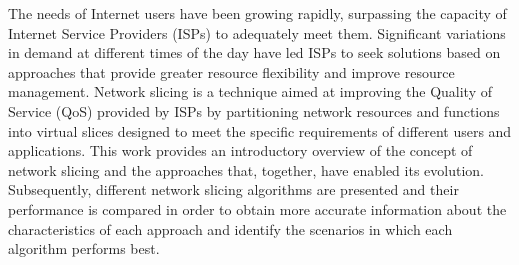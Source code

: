 The needs of Internet users have been growing rapidly, surpassing the capacity of Internet Service Providers (ISPs) to adequately meet them. Significant variations in demand at different times of the day have led ISPs to seek solutions based on approaches that provide greater resource flexibility and improve resource management.
Network slicing is a technique aimed at improving the Quality of Service (QoS) provided by ISPs by partitioning network resources and functions into virtual slices designed to meet the specific requirements of different users and applications. This work provides an introductory overview of the concept of network slicing and the approaches that, together, have enabled its evolution. Subsequently, different network slicing algorithms are presented and their performance is compared in order to obtain more accurate information about the characteristics of each approach and identify the scenarios in which each algorithm performs best.